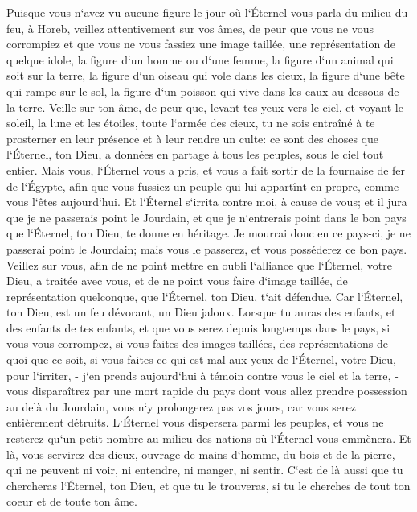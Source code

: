 \verse Puisque vous n`avez vu aucune figure le jour où l`Éternel vous parla du milieu du feu, à Horeb, veillez attentivement sur vos âmes, 
\verse de peur que vous ne vous corrompiez et que vous ne vous fassiez une image taillée, une représentation de quelque idole, la figure d`un homme ou d`une femme, 
\verse la figure d`un animal qui soit sur la terre, la figure d`un oiseau qui vole dans les cieux, 
\verse la figure d`une bête qui rampe sur le sol, la figure d`un poisson qui vive dans les eaux au-dessous de la terre. 
\verse Veille sur ton âme, de peur que, levant tes yeux vers le ciel, et voyant le soleil, la lune et les étoiles, toute l`armée des cieux, tu ne sois entraîné à te prosterner en leur présence et à leur rendre un culte: ce sont des choses que l`Éternel, ton Dieu, a données en partage à tous les peuples, sous le ciel tout entier. 
\verse Mais vous, l`Éternel vous a pris, et vous a fait sortir de la fournaise de fer de l`Égypte, afin que vous fussiez un peuple qui lui appartînt en propre, comme vous l`êtes aujourd`hui. 
\verse Et l`Éternel s`irrita contre moi, à cause de vous; et il jura que je ne passerais point le Jourdain, et que je n`entrerais point dans le bon pays que l`Éternel, ton Dieu, te donne en héritage. 
\verse Je mourrai donc en ce pays-ci, je ne passerai point le Jourdain; mais vous le passerez, et vous posséderez ce bon pays. 
\verse Veillez sur vous, afin de ne point mettre en oubli l`alliance que l`Éternel, votre Dieu, a traitée avec vous, et de ne point vous faire d`image taillée, de représentation quelconque, que l`Éternel, ton Dieu, t`ait défendue. 
\verse Car l`Éternel, ton Dieu, est un feu dévorant, un Dieu jaloux. 
\verse Lorsque tu auras des enfants, et des enfants de tes enfants, et que vous serez depuis longtemps dans le pays, si vous vous corrompez, si vous faites des images taillées, des représentations de quoi que ce soit, si vous faites ce qui est mal aux yeux de l`Éternel, votre Dieu, pour l`irriter, - 
\verse j`en prends aujourd`hui à témoin contre vous le ciel et la terre, -vous disparaîtrez par une mort rapide du pays dont vous allez prendre possession au delà du Jourdain, vous n`y prolongerez pas vos jours, car vous serez entièrement détruits. 
\verse L`Éternel vous dispersera parmi les peuples, et vous ne resterez qu`un petit nombre au milieu des nations où l`Éternel vous emmènera. 
\verse Et là, vous servirez des dieux, ouvrage de mains d`homme, du bois et de la pierre, qui ne peuvent ni voir, ni entendre, ni manger, ni sentir. 
\verse C`est de là aussi que tu chercheras l`Éternel, ton Dieu, et que tu le trouveras, si tu le cherches de tout ton coeur et de toute ton âme. 
